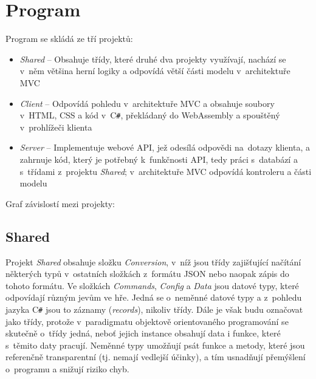 \documentclass[a4paper,12pt]{article}
\def\CS{C\texttt{\#}}
\begin{document}
\section{Program}
Program se skládá ze tří projektů:
\begin{itemize}
\item\textit{Shared} -- Obsahuje třídy, které druhé dva projekty využívají, nachází se v~něm většina herní logiky a odpovídá větší části modelu v~architektuře MVC\cite{mvc}
\item\textit{Client} -- Odpovídá pohledu v~architektuře MVC a obsahuje soubory v~HTML, CSS a kód v~\CS{}, překládaný do WebAssembly a spouštěný v~prohlížeči klienta
\item\textit{Server} -- Implementuje webové API, jež odesílá odpovědi na~dotazy klienta, a zahrnuje kód, který je potřebný k~funkčnosti API, tedy práci s~databází a s~třídami z~projektu \textit{Shared}; v~architektuře MVC odpovídá kontroleru a části modelu
\end{itemize}

Graf závislostí mezi projekty:


\subsection{Shared}
Projekt \textit{Shared} obsahuje složku \textit{Conversion}, v~níž jsou třídy zajišťující načítání některých typů v~ostatních složkách z~formátu JSON nebo naopak zápis do tohoto formátu. Ve složkách \textit{Commands}, \textit{Config} a \textit{Data} jsou datové typy, které odpovídají různým jevům ve hře. Jedná se o~neměnné datové typy a z~pohledu jazyka \CS{} jsou to záznamy (\textit{records}), nikoliv třídy. Dále je však budu označovat jako třídy, protože v~paradigmatu objektově orientovaného programování se skutečně o~třídy jedná, neboť jejich instance obsahují data i funkce, které s~těmito daty pracují.\cite{oop} Neměnné typy umožňují psát funkce a metody, které jsou referenčně transparentní (tj. nemají vedlejší účinky), a tím usnadňují přemýšlení o~programu a snižují riziko chyb. \cite{immutable1}\cite{immutable2}
\end{document}
